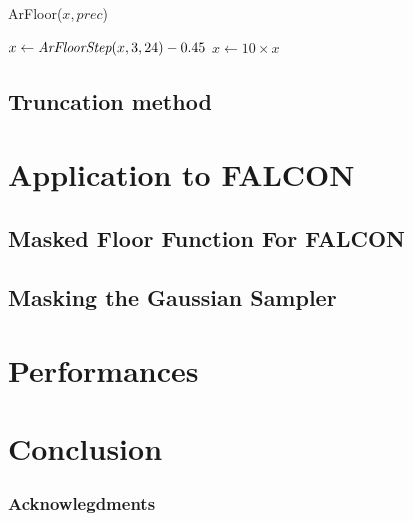 \documentclass[runningheads]{llncs}
\begin{document}
\begin{algorithm}[H]
  \caption{ArFloor($x,prec$)}
  \label{alg:arfloor}
  $x\leftarrow \emph{ArFloorStep}(x,3,24) -\num{0.45}$\;
  $x \leftarrow 10 \times x$\;
\end{algorithm}

\subsection{Truncation method}

\section{Application to FALCON}\label{sec:appfalcon}
\subsection{Masked Floor Function For FALCON}
\subsection{Masking the Gaussian Sampler}
\section{Performances}\label{sec:perf}

\section{Conclusion}\label{sec:conclusion}
\subsubsection{Acknowlegdments}

%
%
%
 
 
\end{document}
